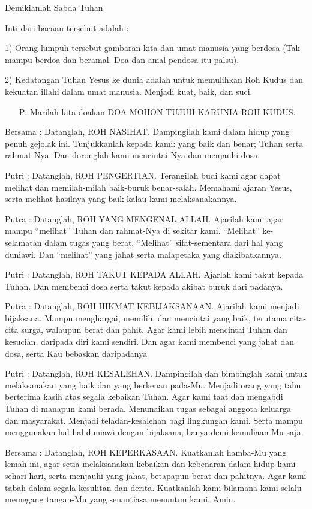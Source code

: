 \documentclass[12pt]{article}
\newcommand{\BP}[1]{\begin{itemize} \item[P:] #1 \end{itemize}}
\begin{document}
Demikianlah Sabda Tuhan

Inti dari bacaan tersebut adalah :

 1) Orang lumpuh tersebut gambaran kita dan umat manusia yang berdosa
(Tak mampu berdoa dan beramal. Doa dan amal pendosa itu palsu). 

2) Kedatangan Tuhan Yesus ke dunia adalah untuk memulihkan Roh Kudus dan
kekuatan illahi dalam umat manusia. Menjadi kuat, baik, dan suci.

\BP{Marilah kita doakan DOA MOHON TUJUH KARUNIA ROH KUDUS.} 

Bersama : Datanglah, ROH NASIHAT. Dampingilah kami dalam hidup yang
penuh gejolak ini. Tunjukkanlah kepada kami:  yang baik dan benar;
Tuhan serta rahmat-Nya. Dan doronglah kami mencintai-Nya dan menjauhi
dosa. 

Putri : Datanglah, ROH PENGERTIAN. Terangilah budi kami agar dapat
melihat dan memilah-milah baik-buruk benar-salah. Memahami ajaran
Yesus, serta melihat hasilnya yang baik kalau kami melaksanakannya. 

Putra : Datanglah, ROH YANG MENGENAL ALLAH. Ajarilah kami agar mampu
{\textquotedblleft}melihat{\textquotedblright} Tuhan dan rahmat-Nya di
sekitar kami. {\textquotedblleft}Melihat{\textquotedblright}
ke-selamatan dalam tugas yang berat.
{\textquotedblleft}Melihat{\textquotedblright} sifat-sementara dari hal
yang duniawi. Dan {\textquotedblleft}melihat{\textquotedblright} yang
jahat serta malapetaka yang diakibatkannya. 

Putri : Datanglah, ROH TAKUT KEPADA ALLAH. Ajarlah kami takut kepada
Tuhan. Dan membenci dosa serta takut kepada akibat buruk dari padanya.

Putra : Datanglah, ROH HIKMAT KEBIJAKSANAAN. Ajarilah kami menjadi
bijaksana. Mampu menghargai, memilih, dan mencintai yang baik, terutama
cita-cita surga, walaupun berat dan pahit. Agar kami lebih mencintai
Tuhan dan kesucian, daripada diri kami sendiri. Dan agar kami membenci
yang jahat dan dosa, serta Kau bebaskan daripadanya 

Putri : Datanglah, ROH KESALEHAN. Dampingilah dan bimbinglah kami untuk
melaksanakan yang baik dan yang berkenan pada-Mu. Menjadi orang yang
tahu berterima kasih atas segala kebaikan Tuhan. Agar kami taat dan
mengabdi Tuhan di manapun kami berada. Menunaikan tugas sebagai anggota
keluarga dan masyarakat. Menjadi teladan-kesalehan bagi lingkungan
kami. Serta mampu menggunakan hal-hal duniawi dengan bijaksana, hanya
demi kemuliaan-Mu saja. 

Bersama : Datanglah, ROH KEPERKASAAN. Kuatkanlah hamba-Mu yang lemah
ini, agar setia melaksanakan kebaikan dan kebenaran dalam hidup kami
sehari-hari, serta menjauhi yang jahat, betapapun berat dan pahitnya.
Agar kami tabah dalam segala kesulitan dan derita. Kuatkanlah kami
bilamana kami selalu memegang tangan-Mu yang senantiasa menuntun kami.
Amin. 
\end{document}
